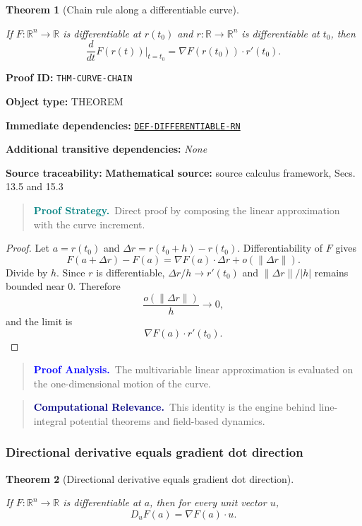 \documentclass[10pt]{article}
\newcommand{\pidraw}[1]{\begingroup\urlstyle{tt}\nolinkurl{#1}\endgroup}
\newcommand{\pidref}[1]{\hyperref[prf:#1]{\pidraw{#1}}}
\newtheorem{theorem}{Theorem}[section]
\theoremstyle{definition}
\theoremstyle{remark}
\newenvironment{proofstrategy}
{\begin{quote}\small\noindent\textbf{\textcolor{teal}{Proof Strategy.}}\ }
{\end{quote}}
\newenvironment{proofanalysis}
{\begin{quote}\small\noindent\textbf{\textcolor{blue}{Proof Analysis.}}\ }
{\end{quote}}
\newenvironment{computationalrelevance}
{\begin{quote}\small\noindent\textbf{\textcolor{navy}{Computational Relevance.}}\ }
{\end{quote}}
\newcommand{\meta}[2]{\noindent\textbf{#1:} #2\par}
\begin{document}
\begin{theorem}[Chain rule along a differentiable curve]\label{prf:THM-CURVE-CHAIN}

If $F:\mathbb{R}^n\to\mathbb{R}$ is differentiable at $r(t_0)$ and
$r:\mathbb{R}\to\mathbb{R}^n$ is differentiable at $t_0$, then
\[
\frac{d}{dt}F(r(t))\Big|_{t=t_0}
=
\nabla F(r(t_0))\cdot r'(t_0).
\]

\end{theorem}

\meta{Proof ID}{\pidraw{THM-CURVE-CHAIN}}
\meta{Object type}{THEOREM}
\meta{Immediate dependencies}{\pidref{DEF-DIFFERENTIABLE-RN}}
\meta{Additional transitive dependencies}{\emph{None}}
\meta{Source traceability}{\textbf{Mathematical source:} source calculus framework, Secs. 13.5 and 15.3}

\begin{proofstrategy}Direct proof by composing the linear approximation with the curve increment.\end{proofstrategy}

\begin{proof}

Let $a=r(t_0)$ and $\Delta r=r(t_0+h)-r(t_0)$. Differentiability of $F$ gives
\[
F(a+\Delta r)-F(a)=\nabla F(a)\cdot\Delta r+o(\|\Delta r\|).
\]
Divide by $h$. Since $r$ is differentiable,
$\Delta r/h\to r'(t_0)$ and $\|\Delta r\|/|h|$ remains bounded near $0$.
Therefore
\[
\frac{o(\|\Delta r\|)}{h}\to0,
\]
and the limit is
\[
\nabla F(a)\cdot r'(t_0).
\]

\end{proof}

\begin{proofanalysis}The multivariable linear approximation is evaluated on the one-dimensional motion of the curve.\end{proofanalysis}

\begin{computationalrelevance}This identity is the engine behind line-integral potential theorems and field-based dynamics.\end{computationalrelevance}

\subsubsection{Directional derivative equals gradient dot direction}

\begin{theorem}[Directional derivative equals gradient dot direction]\label{prf:THM-DIRECTIONAL-GRADIENT}

If $F:\mathbb{R}^n\to\mathbb{R}$ is differentiable at $a$, then for every unit vector $u$,
\[
D_uF(a)=\nabla F(a)\cdot u.
\]

\end{theorem}
\end{document}

